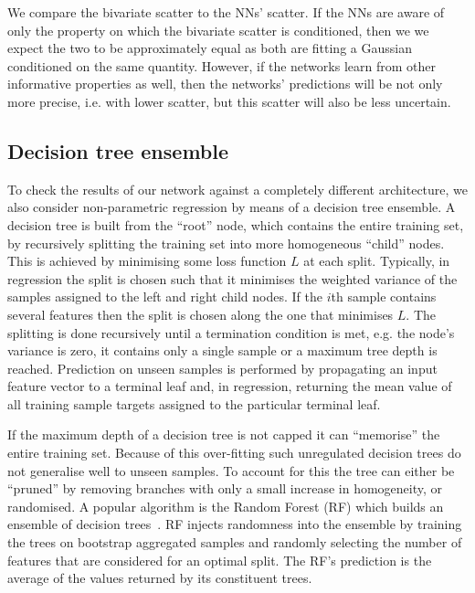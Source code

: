 \documentclass[usenatbib,useAMS]{mnras}
\begin{document}
We compare the bivariate scatter to the \acp{NN}' scatter. If the \acp{NN} are aware of only the property on which the bivariate scatter is conditioned, then we we expect the two to be approximately equal as both are fitting a Gaussian conditioned on the same quantity. However, if the networks learn from other informative properties as well, then the networks' predictions will be not only more precise, i.e. with lower scatter, but this scatter will also be less uncertain.


\subsection{Decision tree ensemble}
\label{sec:decision_trees}

To check the results of our network against a completely different architecture, we also consider non-parametric regression by means of a decision tree ensemble. A decision tree is built from the ``root'' node, which contains the entire training set, by recursively splitting the training set into more homogeneous ``child'' nodes. This is achieved by minimising some loss function $L$ at each split. Typically, in regression the split is chosen such that it minimises the weighted variance of the samples assigned to the left and right child nodes. If the $i$th sample contains several features then the split is chosen along the one that minimises $L$. The splitting is done recursively until a termination condition is met, e.g. the node's variance is zero, it contains only a single sample or a maximum tree depth is reached. Prediction on unseen samples is performed by propagating an input feature vector to a terminal leaf and, in regression, returning the mean value of all training sample targets assigned to the particular terminal leaf.

If the maximum depth of a decision tree is not capped it can ``memorise'' the entire training set. Because of this over-fitting such unregulated decision trees do not generalise well to unseen samples. To account for this the tree can either be ``pruned'' by removing branches with only a small increase in homogeneity, or randomised. A popular algorithm is the Random Forest (RF) which builds an ensemble of decision trees~\citep{Breiman_2001_RandomForest}. RF injects randomness into the ensemble by training the trees on bootstrap aggregated samples and randomly selecting the number of features that are considered for an optimal split. The RF's prediction is the average of the values returned by its constituent trees.
\end{document}
